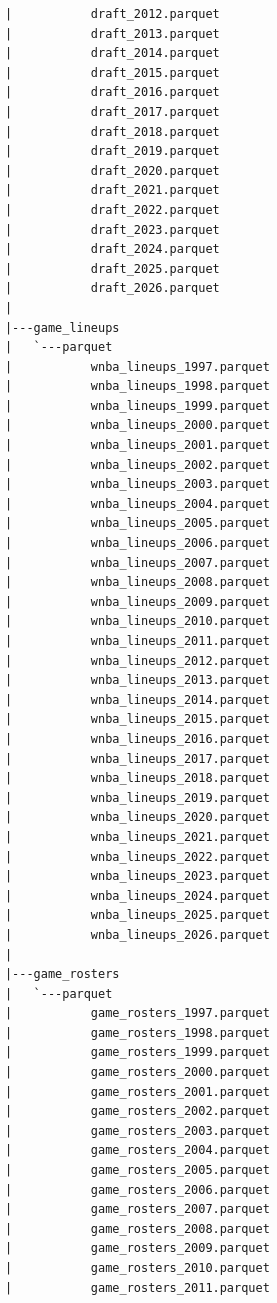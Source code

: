 \begin{lstlisting}
      |           draft_2012.parquet
      |           draft_2013.parquet
      |           draft_2014.parquet
      |           draft_2015.parquet
      |           draft_2016.parquet
      |           draft_2017.parquet
      |           draft_2018.parquet
      |           draft_2019.parquet
      |           draft_2020.parquet
      |           draft_2021.parquet
      |           draft_2022.parquet
      |           draft_2023.parquet
      |           draft_2024.parquet
      |           draft_2025.parquet
      |           draft_2026.parquet
      |
      |---game_lineups
      |   `---parquet
      |           wnba_lineups_1997.parquet
      |           wnba_lineups_1998.parquet
      |           wnba_lineups_1999.parquet
      |           wnba_lineups_2000.parquet
      |           wnba_lineups_2001.parquet
      |           wnba_lineups_2002.parquet
      |           wnba_lineups_2003.parquet
      |           wnba_lineups_2004.parquet
      |           wnba_lineups_2005.parquet
      |           wnba_lineups_2006.parquet
      |           wnba_lineups_2007.parquet
      |           wnba_lineups_2008.parquet
      |           wnba_lineups_2009.parquet
      |           wnba_lineups_2010.parquet
      |           wnba_lineups_2011.parquet
      |           wnba_lineups_2012.parquet
      |           wnba_lineups_2013.parquet
      |           wnba_lineups_2014.parquet
      |           wnba_lineups_2015.parquet
      |           wnba_lineups_2016.parquet
      |           wnba_lineups_2017.parquet
      |           wnba_lineups_2018.parquet
      |           wnba_lineups_2019.parquet
      |           wnba_lineups_2020.parquet
      |           wnba_lineups_2021.parquet
      |           wnba_lineups_2022.parquet
      |           wnba_lineups_2023.parquet
      |           wnba_lineups_2024.parquet
      |           wnba_lineups_2025.parquet
      |           wnba_lineups_2026.parquet
      |
      |---game_rosters
      |   `---parquet
      |           game_rosters_1997.parquet
      |           game_rosters_1998.parquet
      |           game_rosters_1999.parquet
      |           game_rosters_2000.parquet
      |           game_rosters_2001.parquet
      |           game_rosters_2002.parquet
      |           game_rosters_2003.parquet
      |           game_rosters_2004.parquet
      |           game_rosters_2005.parquet
      |           game_rosters_2006.parquet
      |           game_rosters_2007.parquet
      |           game_rosters_2008.parquet
      |           game_rosters_2009.parquet
      |           game_rosters_2010.parquet
      |           game_rosters_2011.parquet

\end{lstlisting}
